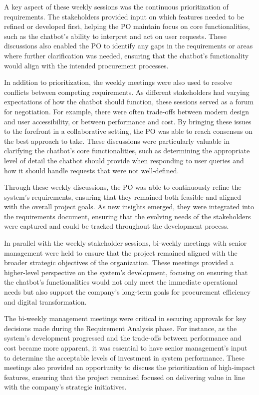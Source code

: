 A key aspect of these weekly sessions was the continuous prioritization of requirements. The stakeholders provided input
on which features needed to be refined or developed first, helping the \acs{PO} maintain focus on core functionalities,
such as the chatbot's ability to interpret and act on user requests. These discussions also enabled the \acs{PO} to identify
any gaps in the requirements or areas where further clarification was needed, ensuring that the chatbot’s functionality
would align with the intended procurement processes.

In addition to prioritization, the weekly meetings were also used to resolve conflicts between competing requirements.
As different stakeholders had varying expectations of how the chatbot should function, these sessions served as a forum
for negotiation. For example, there were often trade-offs between modern design and user accessibility, or between
performance and cost. By bringing these issues to the forefront in a collaborative setting, the \acs{PO} was able to reach
consensus on the best approach to take. These discussions were particularly valuable in clarifying the chatbot’s core
functionalities, such as determining the appropriate level of detail the chatbot should provide when responding to user
queries and how it should handle requests that were not well-defined.

Through these weekly discussions, the \acs{PO} was able to continuously refine the system’s requirements, ensuring that
they remained both feasible and aligned with the overall project goals. As new insights emerged, they were integrated
into the requirements document, ensuring that the evolving needs of the stakeholders were captured and could be tracked
throughout the development process.

In parallel with the weekly stakeholder sessions, bi-weekly meetings with senior management were held to ensure that the
project remained aligned with the broader strategic objectives of the organization. These meetings provided a
higher-level perspective on the system’s development, focusing on ensuring that the chatbot’s functionalities would not
only meet the immediate operational needs but also support the company’s long-term goals for procurement efficiency and
digital transformation.

The bi-weekly management meetings were critical in securing approvals for key decisions made during the Requirement
Analysis phase. For instance, as the system’s development progressed and the trade-offs between performance and cost
became more apparent, it was essential to have senior management’s input to determine the acceptable levels of
investment in system performance. These meetings also provided an opportunity to discuss the prioritization of
high-impact features, ensuring that the project remained focused on delivering value in line with the company’s
strategic initiatives.

